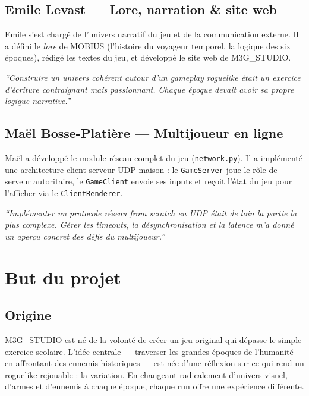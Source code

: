 \documentclass[12pt, a4paper]{report}
\begin{document}
\subsection{Emile Levast --- Lore, narration \& site web}

Emile s'est charg\'{e} de l'univers narratif du jeu et de la communication externe. Il a d\'{e}fini le \textit{lore} de MOBIUS (l'histoire du voyageur temporel, la logique des six \'{e}poques), r\'{e}dig\'{e} les textes du jeu, et d\'{e}velopp\'{e} le site web de M3G\_STUDIO.

\textit{``Construire un univers coh\'{e}rent autour d'un gameplay roguelike \'{e}tait un exercice d'\'{e}criture contraignant mais passionnant. Chaque \'{e}poque devait avoir sa propre logique narrative.''}

\subsection{Ma\"{e}l Bosse-Plati\`{e}re --- Multijoueur en ligne}

Ma\"{e}l a d\'{e}velopp\'{e} le module r\'{e}seau complet du jeu (\texttt{network.py}). Il a impl\'{e}ment\'{e} une architecture client-serveur UDP maison : le \texttt{GameServer} joue le r\^{o}le de serveur autoritaire, le \texttt{GameClient} envoie ses inputs et re\c{c}oit l'\'{e}tat du jeu pour l'afficher via le \texttt{ClientRenderer}.

\textit{``Impl\'{e}menter un protocole r\'{e}seau from scratch en UDP \'{e}tait de loin la partie la plus complexe. G\'{e}rer les timeouts, la d\'{e}synchronisation et la latence m'a donn\'{e} un aper\c{c}u concret des d\'{e}fis du multijoueur.''}

\section{But du projet}

\subsection{Origine}

M3G\_STUDIO est n\'{e} de la volont\'{e} de cr\'{e}er un jeu original qui d\'{e}passe le simple exercice scolaire. L'id\'{e}e centrale --- traverser les grandes \'{e}poques de l'humanit\'{e} en affrontant des ennemis historiques --- est n\'{e}e d'une r\'{e}flexion sur ce qui rend un roguelike rejouable : la variation. En changeant radicalement d'univers visuel, d'armes et d'ennemis \`{a} chaque \'{e}poque, chaque run offre une exp\'{e}rience diff\'{e}rente.
\end{document}
